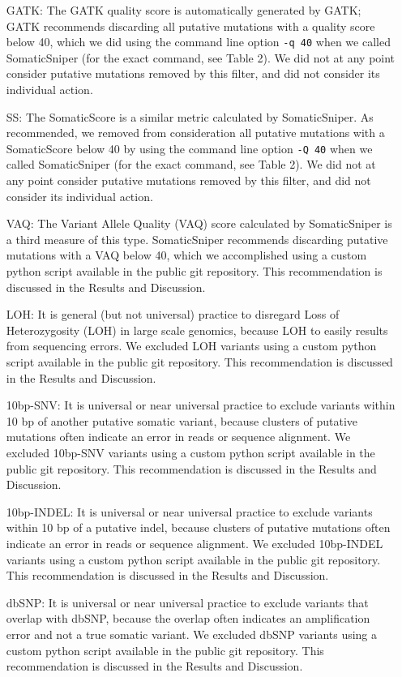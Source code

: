 \documentclass[11 pt]{article} %
\begin{document}
\begin{itemize}
\item[GATK:] The GATK quality score is automatically generated by GATK; GATK recommends discarding all putative mutations with a quality score below 40, which we did using the command line option \texttt{-q 40} when we called SomaticSniper (for the exact command, see Table 2). We did not at any point consider putative mutations removed by this filter, and did not consider its individual action. 
\item[SS:] The SomaticScore is a similar metric calculated by SomaticSniper. As recommended, we removed from consideration all putative mutations with a SomaticScore below 40 by using the command line option \texttt{-Q 40} when we called SomaticSniper (for the exact command, see Table 2). We did not at any point consider putative mutations removed by this filter, and did not consider its individual action. 
\item[VAQ:] The Variant Allele Quality (VAQ) score calculated by SomaticSniper is a third measure of this type. SomaticSniper recommends discarding putative mutations with a VAQ below 40, which we accomplished using a custom python script available in the public git repository. This recommendation is discussed in the Results and Discussion.
\item[LOH:] It is general (but not universal) practice to disregard Loss of Heterozygosity (LOH) in large scale genomics, because LOH to easily results from sequencing errors. We excluded LOH variants using a custom python script available in the public git repository. This recommendation is discussed in the Results and Discussion.
\item[10bp-SNV:] It is universal or near universal practice to exclude variants within 10 bp of another putative somatic variant, because clusters of putative mutations often indicate an error in reads or sequence alignment. We excluded 10bp-SNV variants using a custom python script available in the public git repository. This recommendation is discussed in the Results and Discussion.
\item[10bp-INDEL:] It is universal or near universal practice to exclude variants within 10 bp of a putative indel, because clusters of putative mutations often indicate an error in reads or sequence alignment. We excluded 10bp-INDEL variants using a custom python script available in the public git repository. This recommendation is discussed in the Results and Discussion.
\item[dbSNP:] It is universal or near universal practice to exclude variants that overlap with dbSNP, because the overlap often indicates an amplification error and not a true somatic variant. We excluded dbSNP variants using a custom python script available in the public git repository. This recommendation is discussed in the Results and Discussion.

\end{itemize}
\end{document}
